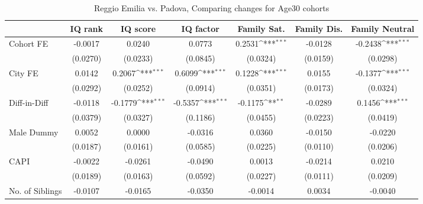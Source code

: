 \begin{table}[htbp]\centering
\def\sym#1{\ifmmode^{#1}\else\(^{#1}\)\fi}
\caption{Reggio Emilia vs. Padova, Comparing changes for Age30 cohorts}
\begin{tabular}{l*{6}{c}}
\toprule
            &\multicolumn{1}{c}{IQ rank}&\multicolumn{1}{c}{IQ score}&\multicolumn{1}{c}{IQ factor}&\multicolumn{1}{c}{Family Sat.}&\multicolumn{1}{c}{Family Dis.}&\multicolumn{1}{c}{Family Neutral}\\
\midrule
Cohort FE   &     -0.0017         &      0.0240         &      0.0773         &      0.2531\sym{***}&     -0.0128         &     -0.2438\sym{***}\\
            &    (0.0270)         &    (0.0233)         &    (0.0845)         &    (0.0324)         &    (0.0159)         &    (0.0298)         \\
\addlinespace
City FE     &      0.0142         &      0.2067\sym{***}&      0.6099\sym{***}&      0.1228\sym{***}&      0.0155         &     -0.1377\sym{***}\\
            &    (0.0292)         &    (0.0252)         &    (0.0914)         &    (0.0351)         &    (0.0173)         &    (0.0324)         \\
\addlinespace
Diff-in-Diff&     -0.0118         &     -0.1779\sym{***}&     -0.5357\sym{***}&     -0.1175\sym{**} &     -0.0289         &      0.1456\sym{***}\\
            &    (0.0379)         &    (0.0327)         &    (0.1186)         &    (0.0455)         &    (0.0223)         &    (0.0419)         \\
\addlinespace
Male Dummy  &      0.0052         &      0.0000         &     -0.0316         &      0.0360         &     -0.0150         &     -0.0220         \\
            &    (0.0187)         &    (0.0161)         &    (0.0585)         &    (0.0225)         &    (0.0110)         &    (0.0206)         \\
\addlinespace
CAPI        &     -0.0022         &     -0.0261         &     -0.0490         &      0.0013         &     -0.0214         &      0.0210         \\
            &    (0.0189)         &    (0.0163)         &    (0.0592)         &    (0.0227)         &    (0.0111)         &    (0.0209)         \\
\addlinespace
No. of Siblings&     -0.0107         &     -0.0165         &     -0.0350         &     -0.0014         &      0.0034         &     -0.0040         \\

\end{tabular}
\end{table}
